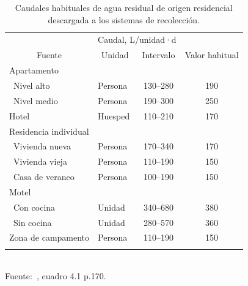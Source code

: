 \begin{table}[!ht]
	\centering
	\caption{Caudales habituales de agua residual de origen residencial descargada a los sistemas de recolección.}
	\label{tab:Qhabituales}
	\begin{tabular}{llcc}
		\noalign{\hrule height 3pt}
		\multicolumn{2}{c}{}                                    & \multicolumn{2}{c}{Caudal, L/unidad·d} \\ \cline{3-4} 
		\multicolumn{1}{c}{Fuente} & \multicolumn{1}{c}{Unidad} & Intervalo       & Valor habitual       \\ \hline
		Apartamento                &                            &                 &                      \\
		\space~Nivel alto                 & Persona                    & 130--280        & 190                  \\
		\space~Nivel medio                & Persona                    & 190--300        & 250                  \\
		Hotel                      & Huesped                    & 110--210        & 170                  \\
		Residencia individual      &                            &                 &                      \\
		\space~Vivienda nueva             & Persona                    & 170--340        & 170                  \\
		\space~Vivienda vieja             & Persona                    & 110--190        & 150                  \\
		\space~Casa de veraneo            & Persona                    & 100--190        & 150                  \\
		Motel                      &                            &                 &                      \\
		\space~Con cocina                 & Unidad                     & 340--680        & 380                  \\
		\space~Sin cocina                 & Unidad                     & 280--570        & 360                  \\
		Zona de campamento         & Persona                    & 110--190        & 150                  \\ \hline \\
	\end{tabular}
	\\\small{Fuente:~\cite{crites2000}, cuadro 4.1 p.170.}
\end{table}

